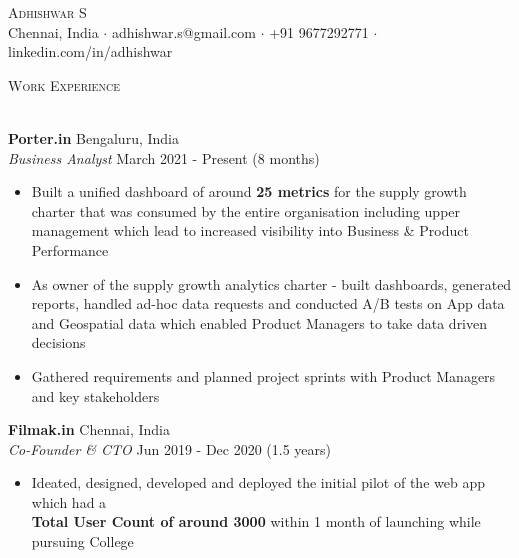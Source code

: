 \documentclass[a4paper]{article}
\newcommand{\lineunder} {
    \vspace*{-8pt} \\
    \hspace*{-18pt} \hrulefill \\
}
\newcommand{\header} [1] {
    {\hspace*{-18pt}\vspace*{6pt} \textsc{#1}}
    \vspace*{-6pt} \lineunder
}
\begin{document}
\vspace*{-40pt}

    

\vspace*{-10pt}
\begin{center}
    {\Huge \scshape {Adhishwar S}}\\
    Chennai, India $\cdot$ adhishwar.s@gmail.com $\cdot$ +91 9677292771 $\cdot$ linkedin.com/in/adhishwar\\
\end{center}

\header{Work Experience}
\vspace{1mm}


\textbf{Porter.in} \hfill Bengaluru, India\\
\textit{Business Analyst} \hfill March 2021 - Present (8 months)\\
\vspace{-1mm}
\begin{itemize} \itemsep 1pt
    \item Built a unified dashboard of around \textbf{25 metrics} for the supply growth charter that was consumed by the entire organisation including upper management which lead to increased visibility into Business \& Product Performance
    \item As owner of the supply growth analytics charter - built dashboards, generated reports, handled ad-hoc data requests and conducted A/B tests on App data and Geospatial data which enabled Product Managers to take data driven decisions
    \item Gathered requirements and planned project sprints with Product Managers and key stakeholders
\end{itemize}
\textbf{Filmak.in} \hfill Chennai, India\\
\textit{Co-Founder \& CTO} \hfill Jun 2019 - Dec 2020 (1.5 years)\\
\vspace{-1mm}
\begin{itemize} \itemsep 1pt
    \item Ideated, designed, developed and deployed the initial pilot of the web app which had a\\ \textbf{Total User Count of around 3000} within 1 month of launching while pursuing College
\end{itemize}
\end{document}
